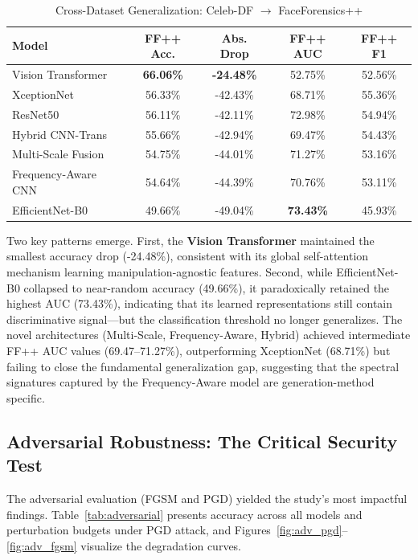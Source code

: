 \documentclass[runningheads]{llncs}
\begin{document}
\begin{table}[H]
\caption{Cross-Dataset Generalization: Celeb-DF $\rightarrow$ FaceForensics++}
\label{tab:cross_dataset}
\centering
\small
\setlength{\tabcolsep}{6pt}
\begin{tabular}{lcccc}
\toprule
\textbf{Model} & \textbf{FF++ Acc.} & \textbf{Abs. Drop} & \textbf{FF++ AUC} & \textbf{FF++ F1} \\
\midrule
Vision Transformer   & \textbf{66.06\%} & \textbf{-24.48\%} & 52.75\% & 52.56\% \\
XceptionNet          & 56.33\% & -42.43\% & 68.71\% & 55.36\% \\
ResNet50             & 56.11\% & -42.11\% & 72.98\% & 54.94\% \\
Hybrid CNN-Trans     & 55.66\% & -42.94\% & 69.47\% & 54.43\% \\
Multi-Scale Fusion   & 54.75\% & -44.01\% & 71.27\% & 53.16\% \\
Frequency-Aware CNN  & 54.64\% & -44.39\% & 70.76\% & 53.11\% \\
EfficientNet-B0      & 49.66\% & -49.04\% & \textbf{73.43\%} & 45.93\% \\
\bottomrule
\end{tabular}
\end{table}

Two key patterns emerge. First, the \textbf{Vision Transformer} maintained the smallest accuracy drop (-24.48\%), consistent with its global self-attention mechanism learning manipulation-agnostic features. Second, while EfficientNet-B0 collapsed to near-random accuracy (49.66\%), it paradoxically retained the highest AUC (73.43\%), indicating that its learned representations still contain discriminative signal---but the classification threshold no longer generalizes. The novel architectures (Multi-Scale, Frequency-Aware, Hybrid) achieved intermediate FF++ AUC values (69.47--71.27\%), outperforming XceptionNet (68.71\%) but failing to close the fundamental generalization gap, suggesting that the spectral signatures captured by the Frequency-Aware model are generation-method specific.

\subsection{Adversarial Robustness: The Critical Security Test}
The adversarial evaluation (FGSM and PGD) yielded the study's most impactful findings. Table~\ref{tab:adversarial} presents accuracy across all models and perturbation budgets under PGD attack, and Figures~\ref{fig:adv_pgd}--\ref{fig:adv_fgsm} visualize the degradation curves.
\end{document}

